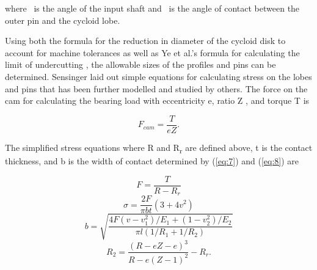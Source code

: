\documentclass[letterpaper, 10 pt, conference]{ieeeconf}  %
\begin{document}
where \textphi\ is the angle of the input shaft and \textpsi\ is the angle of contact between the outer pin and the cycloid lobe. 

Using both the formula for the reduction in diameter of the cycloid disk to account for machine tolerances \cite{machine_design} \cite{design_and_application} as well as Ye et al.'s formula for calculating the limit of undercutting \cite{ye}, the allowable sizes of the profiles and pins can be determined. Sensinger \cite{unified_approach} laid out simple equations for calculating stress on the lobes and pins that has been further modelled and studied by others. The force on the cam for calculating the bearing load with eccentricity e, ratio Z , and torque T is

\begin{equation} \label{eq:4}
F_{cam} = \frac{T}{e Z}.
\end{equation}

The simplified stress equations where R and R\textsubscript{r} are defined above, t is the contact thickness, and b is the width of contact determined by (\ref{eq:7}) and (\ref{eq:8}) are

\begin{equation} \label{eq:5}
F = \frac{T}{R - R_r}
\end{equation}
\begin{equation} \label{eq:6}
\sigma = \frac{2F}{\pi b t} (3 + 4v^2)
\end{equation}
\begin{equation} \label{eq:7}
b = \sqrt{\frac{4F (v-v_1^2) /E_1 + (1 - v_2^2)/E_2}{\pi l (1/R_1 + 1/R_2)}}
\end{equation}
\begin{equation} \label{eq:8}
R_2 = \frac{(R-eZ - e)^3}{R-e(Z-1)^2} - R_r.
\end{equation}
\end{document}
